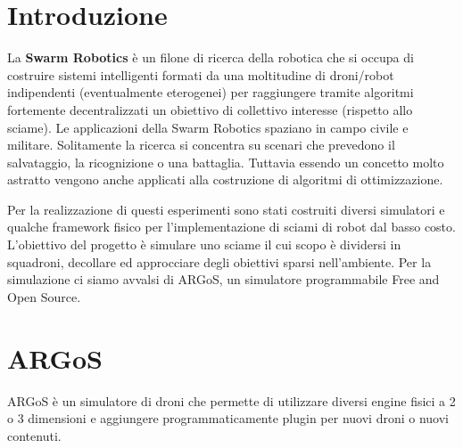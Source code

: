 \documentclass[a4paper,11pt,oneside, table]{article}
\begin{document}
    \printindex
    \tableofcontents
    \renewcommand{\baselinestretch}{1.5}

\printbibliography[title={Bibliografia}]

\section{Introduzione}

La \textbf{Swarm Robotics} \`e un filone di ricerca della robotica che si occupa di costruire sistemi intelligenti formati da una moltitudine di droni/robot indipendenti (eventualmente eterogenei) per raggiungere tramite algoritmi fortemente decentralizzati un obiettivo di collettivo interesse (rispetto allo sciame).
Le applicazioni della Swarm Robotics spaziano in campo civile e militare.
Solitamente la ricerca si concentra su scenari che prevedono il salvataggio, la ricognizione o una battaglia.
Tuttavia essendo un concetto molto astratto vengono anche applicati alla costruzione di algoritmi di ottimizzazione.

Per la realizzazione di questi esperimenti sono stati costruiti diversi simulatori e qualche framework fisico per l'implementazione di sciami di robot dal basso costo.
L'obiettivo del progetto \`e simulare uno sciame il cui scopo \`e dividersi in squadroni, decollare ed approcciare degli obiettivi sparsi nell'ambiente.
Per la simulazione ci siamo avvalsi di ARGoS, un simulatore programmabile Free and Open Source.

\section{ARGoS}

ARGoS \`e un simulatore di droni che permette di utilizzare diversi engine fisici a 2 o 3 dimensioni e aggiungere programmaticamente plugin per nuovi droni o nuovi contenuti.
\end{document}
